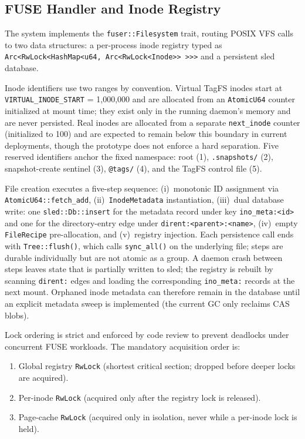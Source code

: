 \documentclass[5p,times]{elsarticle}
\begin{document}
\subsection{FUSE Handler and Inode Registry}

The system implements the \texttt{fuser::Filesystem} trait, routing POSIX
VFS calls to two data structures: a per-process inode registry typed as
\texttt{Arc\textless{}RwLock\textless{}HashMap\textless{}u64,
Arc\textless{}RwLock\textless{}Inode\textgreater{}\textgreater{}%
\textgreater{}\textgreater{}\textgreater{}} and a persistent sled database.

Inode identifiers use two ranges by convention.  Virtual TagFS inodes
start at \texttt{VIRTUAL\_INODE\_START} = 1,000,000 and are allocated
from an \texttt{AtomicU64} counter initialized at mount time; they exist
only in the running daemon's memory and are never persisted.  Real inodes
are allocated from a separate \texttt{next\_inode} counter (initialized
to 100) and are expected to remain below this boundary in current
deployments, though the prototype does not enforce a hard separation.
Five reserved identifiers anchor the fixed namespace:
root (1), \texttt{.snapshots/} (2), snapshot-create sentinel (3),
\texttt{@tags/} (4), and the TagFS control file (5).

File creation executes a five-step sequence: (i)~monotonic ID
assignment via \texttt{AtomicU64::fetch\_add}, (ii)~\texttt{InodeMetadata}
instantiation, (iii)~dual database write: one \texttt{sled::Db::insert}
for the metadata record under key \texttt{ino\_meta:\textless{}id\textgreater{}}
and one for the directory-entry edge under
\texttt{dirent:\textless{}parent\textgreater{}:\textless{}name\textgreater{}},
(iv)~empty \texttt{FileRecipe} pre-allocation, and (v)~registry injection.
Each persistence call ends with \texttt{Tree::flush()}, which calls
\texttt{sync\_all()} on the underlying file; steps are durable
individually but are not atomic as a group.  A daemon crash between
steps leaves state that is partially written to sled; the registry is
rebuilt by scanning \texttt{dirent:} edges and loading the corresponding
\texttt{ino\_meta:} records at the next mount.  Orphaned inode metadata
can therefore remain in the database until an explicit metadata sweep
is implemented (the current GC only reclaims CAS blobs).

Lock ordering is strict and enforced by code review to prevent
deadlocks under concurrent FUSE workloads.  The mandatory acquisition
order is:
\begin{enumerate}
\item Global registry \texttt{RwLock} (shortest critical section; dropped
  before deeper locks are acquired).
\item Per-inode \texttt{RwLock} (acquired only after the registry lock
  is released).
\item Page-cache \texttt{RwLock} (acquired only in isolation, never while
  a per-inode lock is held).
\end{enumerate}
\end{document}
